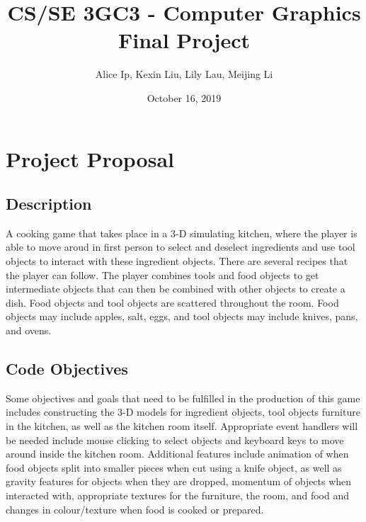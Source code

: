 \documentclass[11pt]{article}
\author{Alice Ip, Kexin Liu, Lily Lau, Meijing Li}
\date{October 16, 2019}
\title{CS/SE 3GC3 - Computer Graphics Final Project}
\begin{document}
\maketitle

\section*{Project Proposal}
\label{sec:org0684215}

\subsection*{Description}
\label{sec:org12e0e36}
A cooking game that takes place in a 3-D simulating kitchen, where the player is able 
to move aroud in first person to select and deselect ingredients and use tool 
objects to interact with these ingredient objects. There are several recipes 
that the player can follow. The player combines tools and food objects to get
 intermediate objects that can then be combined with other objects to create a dish.
 Food objects and tool objects are scattered throughout the room. Food objects may
 include apples, salt, eggs, and tool objects may include knives, pans, and ovens.


\subsection*{Code Objectives}
\label{sec:orga6abff0}
Some objectives and goals that need to be fulfilled in the production of this 
game includes constructing the 3-D models for ingredient objects, tool objects
furniture in the kitchen, as well as the kitchen room itself. Appropriate event
handlers will be needed include mouse clicking to select objects and keyboard keys
to move around inside the kitchen room. Additional features include animation 
of when food objects split into smaller pieces when cut using a knife object, as 
well as gravity features for objects when they are dropped, momentum of objects
when interacted with, appropriate textures for the furniture, the room, and food
and changes in colour/texture when food is cooked or prepared.
\end{document}

